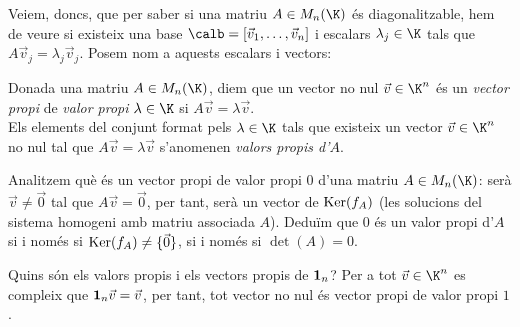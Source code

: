 Veiem, doncs, que per saber si una matriu $A\in M_n(\K)$ és diagonalitzable, hem de veure si existeix una base $\calb=[\vec v_1, \dots, \vec v_n]$ i escalars $\lambda_j\in\K$ tals que $A\vec v_j=\lambda_j \vec v_j$. Posem nom a aquests escalars i vectors:
\begin{definicio}\label{def:vapivep}
Donada una matriu $A\in M_n(\K)$, diem que un vector no nul $\vec v\in \K^n$ és un \emph{vector propi} de \emph{valor propi} $\lambda \in \K$ si $A\vec v=\lambda \vec v$.\\
Els elements del conjunt format pels $\lambda\in \K$ tals que existeix un vector $\vec v\in\K^n$ no nul tal que $A\vec v=\lambda \vec v$ s'anomenen \emph{valors propis d'$A$}.
\end{definicio}
\begin{exemple}
Analitzem què és un vector propi de valor propi $0$ d'una matriu $A\in M_n(\K)$: serà $\vec v\neq \vec 0$ tal que $A\vec v=\vec 0$, per tant, serà un vector de $\operatorname{Ker}(f_A)$ (les solucions del sistema homogeni amb matriu associada $A$). Deduïm que $0$ és un valor propi d'$A$ si i només si $\operatorname{Ker}(f_A)\neq \{\vec 0\}$, si i només si $\det(A)=0$.
\end{exemple}
\begin{exemple}\label{exem:nuclivap0}
Quins són els valors propis i els vectors propis de $\mathbf{1}_n$? Per a tot $\vec v\in\K^n$ es compleix que $\mathbf{1}_n\vec v=\vec v$, per tant, tot vector no nul és vector propi de valor propi $1$.
\end{exemple}
